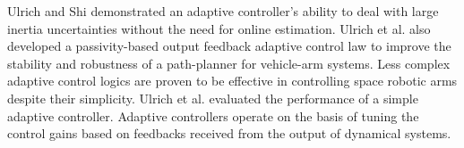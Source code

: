 \documentclass[lettersize,journal]{IEEEtran}
\begin{document}
Ulrich and Shi demonstrated an adaptive controller's ability to deal with large inertia uncertainties without the need for online estimation\cite{Shi2015}. Ulrich et al. also developed a passivity-based output feedback adaptive control law to improve the stability and robustness of a path-planner for vehicle-arm systems\cite{Ulrich2016}. Less complex adaptive control logics are proven to be effective in controlling space robotic arms despite their simplicity\cite{Ulrich2012}. Ulrich et al. evaluated the performance of a simple adaptive controller\cite{Ulrich2014}{}. 
Adaptive controllers operate on the basis of tuning the control gains based on feedbacks received from the output of dynamical systems. 
\end{document}
